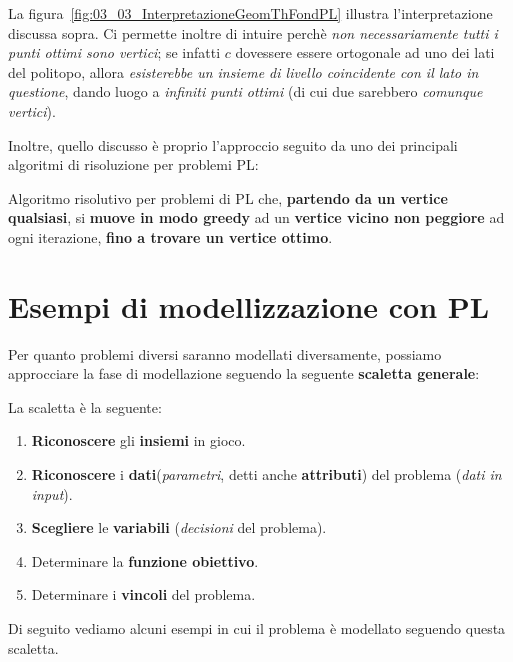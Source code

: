 La figura~\ref{fig:03_03_InterpretazioneGeomThFondPL} illustra l'interpretazione discussa sopra. 
Ci permette inoltre di intuire perchè \textit{non necessariamente tutti i punti ottimi sono vertici};
se infatti $c$ dovessere essere ortogonale ad uno dei lati del politopo, allora 
\textit{esisterebbe un insieme di livello coincidente con il lato in questione}, dando luogo a
\textit{infiniti punti ottimi} (di cui due sarebbero \textit{comunque vertici}).

Inoltre, quello discusso è proprio l'approccio seguito da uno dei principali algoritmi di
risoluzione per problemi PL:

\begin{definition}
    Algoritmo risolutivo per problemi di PL che, \textbf{partendo da un vertice qualsiasi},
    si \textbf{muove in modo greedy} ad un \textbf{vertice vicino non peggiore} ad ogni
    iterazione, \textbf{fino a trovare un vertice ottimo}.
\end{definition}

\section{Esempi di modellizzazione con PL}

Per quanto problemi diversi saranno modellati diversamente, possiamo approcciare 
la fase di modellazione seguendo la seguente \textbf{scaletta generale}:

\begin{remark}
    La scaletta è la seguente:
    \begin{enumerate}
        \item \textbf{Riconoscere} gli \textbf{insiemi} in gioco.
        \item \textbf{Riconoscere} i \textbf{dati}(\textit{parametri}, detti anche \textbf{attributi}) 
            del problema (\textit{dati in input}).
        \item \textbf{Scegliere} le \textbf{variabili} (\textit{decisioni} del
            problema).
        \item Determinare la \textbf{funzione obiettivo}.
        \item Determinare i \textbf{vincoli} del problema.
    \end{enumerate}
\end{remark}

Di seguito vediamo alcuni esempi in cui il problema è modellato seguendo
questa scaletta.

